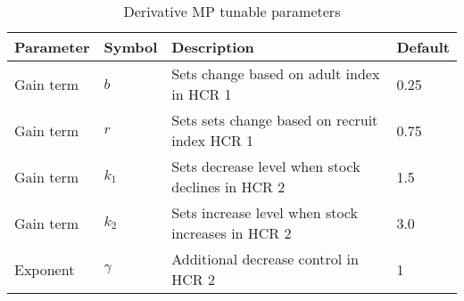\begin{table}[h]
\centering
\caption{Derivative MP tunable parameters}
\begin{tabular}{p{3cm}p{1.2cm}p{6cm}p{2cm}} 
  \hline
  Parameter & Symbol & Description & Default \\ 
  \hline
   Gain term &$b$      & Sets change based on adult index in HCR 1         & 0.25\\
   Gain term &$r$      & Sets sets change based on recruit index HCR 1     & 0.75\\
   Gain term &$k_1$    & Sets decrease level when stock declines in HCR 2  &1.5 \\
   Gain term &$k_2$    & Sets increase level when stock increases in HCR 2 &3.0 \\
   Exponent  &$\gamma$ & Additional decrease control in HCR 2              & 1  \\
  \hline
\end{tabular}
\end{table}


